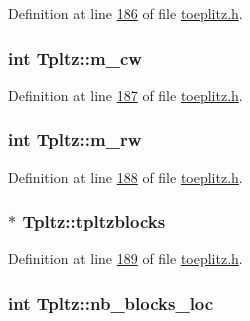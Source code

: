 Definition at line \hyperlink{toeplitz_8h_source_l00186}{186} of file \hyperlink{toeplitz_8h_source}{toeplitz.\-h}.

\hypertarget{structTpltz_a6025c0048255a299edfb4f88ca01e7ec}{
\subsubsection[{m\-\_\-cw}]{\setlength{\rightskip}{0pt plus 5cm}int Tpltz\-::m\-\_\-cw}}\label{structTpltz_a6025c0048255a299edfb4f88ca01e7ec}


Definition at line \hyperlink{toeplitz_8h_source_l00187}{187} of file \hyperlink{toeplitz_8h_source}{toeplitz.\-h}.

\hypertarget{structTpltz_a0ad1c2bba1b44cc8e1a700813195d0a0}{
\subsubsection[{m\-\_\-rw}]{\setlength{\rightskip}{0pt plus 5cm}int Tpltz\-::m\-\_\-rw}}\label{structTpltz_a0ad1c2bba1b44cc8e1a700813195d0a0}


Definition at line \hyperlink{toeplitz_8h_source_l00188}{188} of file \hyperlink{toeplitz_8h_source}{toeplitz.\-h}.

\hypertarget{structTpltz_ae2ec369f6eaac15a2353231b50270990}{
\subsubsection[{tpltzblocks}]{$\ast$ Tpltz\-::tpltzblocks}}\label{structTpltz_ae2ec369f6eaac15a2353231b50270990}


Definition at line \hyperlink{toeplitz_8h_source_l00189}{189} of file \hyperlink{toeplitz_8h_source}{toeplitz.\-h}.

\hypertarget{structTpltz_a4090e9931928ca56b30db246ff77ce29}{
\subsubsection[{nb\-\_\-blocks\-\_\-loc}]{\setlength{\rightskip}{0pt plus 5cm}int Tpltz\-::nb\-\_\-blocks\-\_\-loc}}\label{structTpltz_a4090e9931928ca56b30db246ff77ce29}


